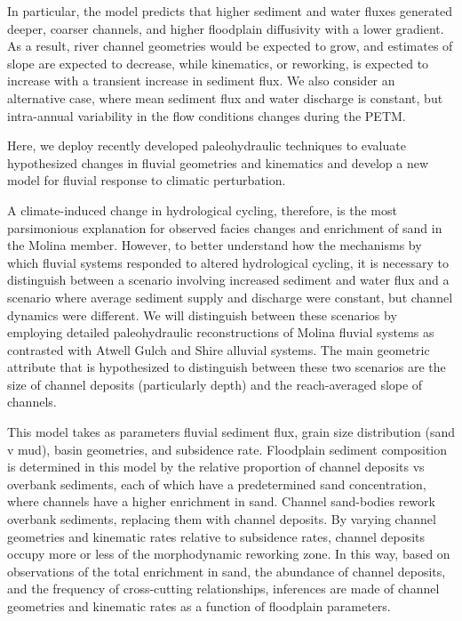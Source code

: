 \documentclass[draft]{compact_proposal}
\begin{document}
In particular, the \cnote[BZF] model predicts that higher sediment and water fluxes generated deeper, coarser channels, and higher floodplain diffusivity with a lower gradient.
As a result, river channel geometries would be expected to grow, and estimates of slope are expected to decrease, while kinematics, or reworking, is expected to increase with a transient increase in sediment flux.
We also consider an alternative case, where mean sediment flux and water discharge is constant, but intra-annual variability in the flow conditions changes during the PETM.

Here, we deploy recently developed paleohydraulic techniques to evaluate hypothesized changes in fluvial geometries and kinematics and develop a new model for fluvial response to climatic perturbation.


A climate-induced change in hydrological cycling, therefore, is the most parsimonious explanation for observed facies changes and enrichment of sand in the Molina member.
However, to better understand how the mechanisms by which fluvial systems responded to altered hydrological cycling, it is necessary to distinguish between a scenario involving increased sediment and water flux and a scenario where average sediment supply and discharge were constant, but channel dynamics were different.
We will distinguish between these scenarios by employing detailed paleohydraulic reconstructions of Molina fluvial systems as contrasted with Atwell Gulch and Shire alluvial systems.
The main geometric attribute that is hypothesized to distinguish between these two scenarios are the size of channel deposits (particularly depth) and the reach-averaged slope of channels.



This model takes as parameters fluvial sediment flux, grain size distribution (sand v mud), basin geometries, and subsidence rate.
Floodplain sediment composition is determined in this model by the relative proportion of channel deposits vs overbank sediments, each of which have a predetermined sand concentration, where channels have a higher enrichment in sand.
Channel sand-bodies rework overbank sediments, replacing them with channel deposits.
By varying channel geometries and kinematic rates relative to subsidence rates, channel deposits occupy more or less of the morphodynamic reworking zone.
In this way, based on observations of the total enrichment in sand, the abundance of channel deposits, and the frequency of cross-cutting relationships, inferences are made of channel geometries and kinematic rates as a function of floodplain parameters.




\printbibliography
\end{document}
